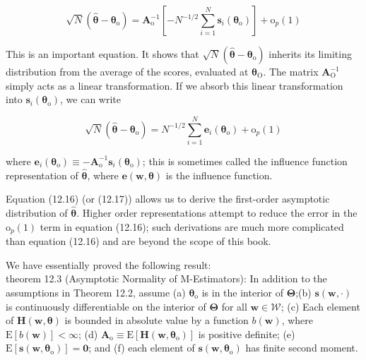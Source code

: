 \documentclass[10pt]{article}
\begin{document}
\begin{equation*}
\sqrt{N}\left(\hat{\boldsymbol{\theta}}-\boldsymbol{\theta}_{\mathrm{o}}\right)=\mathbf{A}_{\mathrm{o}}^{-1}\left[-N^{-1 / 2} \sum_{i=1}^{N} \mathbf{s}_{i}\left(\boldsymbol{\theta}_{\mathrm{o}}\right)\right]+\mathrm{o}_{p}(1) \tag{12.16}
\end{equation*}


This is an important equation. It shows that $\sqrt{N}\left(\hat{\boldsymbol{\theta}}-\boldsymbol{\theta}_{\mathrm{o}}\right)$ inherits its limiting distribution from the average of the scores, evaluated at $\boldsymbol{\theta}_{\mathrm{O}}$. The matrix $\mathbf{A}_{\mathrm{O}}^{-1}$ simply acts as a linear transformation. If we absorb this linear transformation into $\mathbf{s}_{i}\left(\boldsymbol{\theta}_{\mathrm{o}}\right)$, we can write


\begin{equation*}
\sqrt{N}\left(\hat{\boldsymbol{\theta}}-\boldsymbol{\theta}_{\mathrm{o}}\right)=N^{-1 / 2} \sum_{i=1}^{N} \mathbf{e}_{i}\left(\boldsymbol{\theta}_{\mathrm{o}}\right)+\mathrm{o}_{p}(1) \tag{12.17}
\end{equation*}


where $\mathbf{e}_{i}\left(\boldsymbol{\theta}_{\mathrm{o}}\right) \equiv-\mathbf{A}_{\mathrm{o}}^{-1} \mathbf{s}_{i}\left(\boldsymbol{\theta}_{\mathrm{o}}\right)$; this is sometimes called the influence function representation of $\hat{\boldsymbol{\theta}}$, where $\mathbf{e}(\mathbf{w}, \boldsymbol{\theta})$ is the influence function.

Equation (12.16) (or (12.17)) allows us to derive the first-order asymptotic distribution of $\hat{\boldsymbol{\theta}}$. Higher order representations attempt to reduce the error in the $\mathrm{o}_{p}(1)$ term in equation (12.16); such derivations are much more complicated than equation (12.16) and are beyond the scope of this book.

We have essentially proved the following result:\\
theorem 12.3 (Asymptotic Normality of M-Estimators): In addition to the assumptions in Theorem 12.2, assume (a) $\boldsymbol{\theta}_{\mathrm{o}}$ is in the interior of $\boldsymbol{\Theta}$;(b) $\mathbf{s}(\mathbf{w}, \cdot)$ is continuously differentiable on the interior of $\boldsymbol{\Theta}$ for all $\mathbf{w} \in \mathscr{W}$; (c) Each element of $\mathbf{H}(\mathbf{w}, \boldsymbol{\theta})$ is bounded in absolute value by a function $b(\mathbf{w})$, where $\mathrm{E}[b(\mathbf{w})]<\infty$; (d) $\mathbf{A}_{\mathrm{o}} \equiv \mathrm{E}\left[\mathbf{H}\left(\mathbf{w}, \boldsymbol{\theta}_{\mathrm{o}}\right)\right]$ is positive definite; (e) $\mathrm{E}\left[\mathbf{s}\left(\mathbf{w}, \boldsymbol{\theta}_{\mathrm{o}}\right)\right]=\mathbf{0}$; and (f) each element of $\mathbf{s}\left(\mathbf{w}, \boldsymbol{\theta}_{\mathrm{o}}\right)$ has finite second moment.
\end{document}
